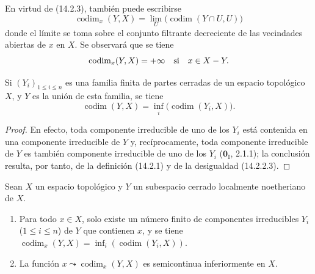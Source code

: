 En virtud de (14.2.3), también puede escribirse
\[
  \operatorname{codim}_x(Y,X)=
  \lim_U\bigl(\operatorname{codim}(Y\cap U,U)\bigr)
  \tag{14.2.4.1}\label{0.14.2.4.1-fr}
\]
donde el límite se toma sobre el conjunto filtrante decreciente de las
vecindades abiertas de $x$ en $X$. Se observará que se tiene
\[
  \operatorname{codim}_x(Y,X)=+\infty\quad\text{si}\quad x\in X- Y.
\]

\begin{proposition}[14.2.5]
\label{0.14.2.5-fr}
Si $(Y_i)_{1\leq i\leq n}$ es una familia finita de partes cerradas de un
espacio topológico $X$, y $Y$ es la unión de esta familia, se tiene
\[
  \operatorname{codim}(Y,X)=
  \inf_i\bigl(\operatorname{codim}(Y_i,X)\bigr).
  \tag{14.2.5.1}\label{0.14.2.5.1-fr}
\]
\end{proposition}

\begin{proof}
En efecto, toda componente irreducible de uno de los $Y_i$ está contenida en
una componente irreducible de $Y$ y, recíprocamente, toda componente
irreducible de $Y$ es también componente irreducible de uno de los $Y_i$
($\mathbf{0}_{\mathrm I}$, 2.1.1); la conclusión resulta, por tanto, de la definición
(14.2.1) y de la desigualdad (14.2.2.3).
\end{proof}

\begin{corollary}[14.2.6]
\label{0.14.2.6-fr}
Sean $X$ un espacio topológico y $Y$ un subespacio cerrado localmente
noetheriano de $X$.
\begin{enumerate}
  \item[\rm(i)] Para todo $x\in X$, solo existe un número finito de
  componentes irreducibles $Y_i$ \textup{($1\leq i\leq n$)} de $Y$ que contienen $x$,
  y se tiene
  $\operatorname{codim}_x(Y,X)=
  \inf_i(\operatorname{codim}(Y_i,X))$.
  \item[\rm(ii)] La función
  $x\leadsto\operatorname{codim}_x(Y,X)$ es semicontinua inferiormente en $X$.
\end{enumerate}
\end{corollary}

